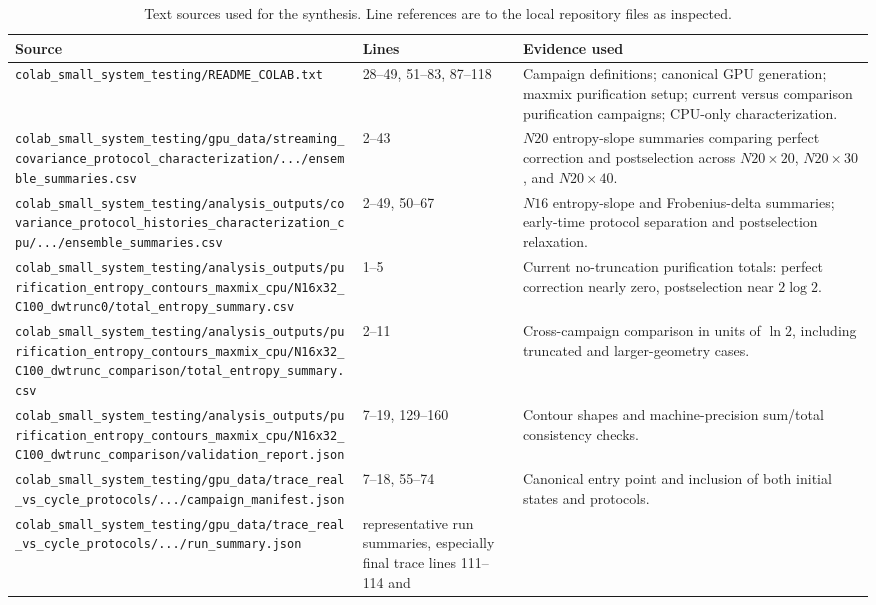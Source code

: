 \documentclass[aps,prb,onecolumn,nofootinbib,superscriptaddress]{revtex4-2}
\begin{document}
\begin{table}[h]
\caption{Text sources used for the synthesis.  Line references are to the local
repository files as inspected.}
\begin{ruledtabular}
\begin{tabular}{p{}p{}p{}}
Source & Lines & Evidence used \\
\midrule
\texttt{colab\_small\_system\_testing/README\_COLAB.txt}
& 28--49, 51--83, 87--118
& Campaign definitions; canonical GPU generation; maxmix purification setup;
current versus comparison purification campaigns; CPU-only characterization. \\
\texttt{colab\_small\_system\_testing/gpu\_data/streaming\_covariance\_protocol\_characterization/.../ensemble\_summaries.csv}
& 2--43
& $N20$ entropy-slope summaries comparing perfect correction and postselection
across $N20\times20$, $N20\times30$, and $N20\times40$. \\
\texttt{colab\_small\_system\_testing/analysis\_outputs/covariance\_protocol\_histories\_characterization\_cpu/.../ensemble\_summaries.csv}
& 2--49, 50--67
& $N16$ entropy-slope and Frobenius-delta summaries; early-time protocol
separation and postselection relaxation. \\
\texttt{colab\_small\_system\_testing/analysis\_outputs/purification\_entropy\_contours\_maxmix\_cpu/N16x32\_C100\_dwtrunc0/total\_entropy\_summary.csv}
& 1--5
& Current no-truncation purification totals: perfect correction nearly zero,
postselection near $2\log2$. \\
\texttt{colab\_small\_system\_testing/analysis\_outputs/purification\_entropy\_contours\_maxmix\_cpu/N16x32\_C100\_dwtrunc\_comparison/total\_entropy\_summary.csv}
& 2--11
& Cross-campaign comparison in units of $\ln2$, including truncated and
larger-geometry cases. \\
\texttt{colab\_small\_system\_testing/analysis\_outputs/purification\_entropy\_contours\_maxmix\_cpu/N16x32\_C100\_dwtrunc\_comparison/validation\_report.json}
& 7--19, 129--160
& Contour shapes and machine-precision sum/total consistency checks. \\
\texttt{colab\_small\_system\_testing/gpu\_data/trace\_real\_vs\_cycle\_protocols/.../campaign\_manifest.json}
& 7--18, 55--74
& Canonical entry point and inclusion of both initial states and protocols. \\
\texttt{colab\_small\_system\_testing/gpu\_data/trace\_real\_vs\_cycle\_protocols/.../run\_summary.json}
& representative run summaries, especially final trace lines 111--114 and

\end{tabular}
\end{ruledtabular}
\end{table}
\end{document}
